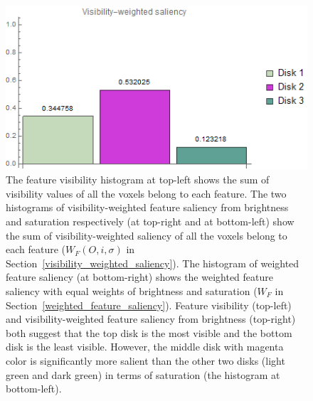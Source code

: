 \begin{figure}
\begin{minipage}{.2\textwidth}
	\end{minipage}~
	\begin{minipage}{.2\textwidth}
		\includegraphics[width=1\linewidth]{images/disk_visibility_saliency_weighted_chart_left.png}
	\end{minipage}
	\caption{The feature visibility \cite{wang_efficient_2011} histogram at top-left shows the sum of visibility values of all the voxels belong to each feature.
		The two histograms of visibility-weighted feature saliency from brightness and saturation respectively (at top-right and at bottom-left) show the sum of visibility-weighted saliency of all the voxels belong to each feature ($ W_{F}(O,i,\sigma) $ in Section~\ref{visibility_weighted_saliency}).
		The histogram of weighted feature saliency (at bottom-right) shows the weighted feature saliency with equal weights of brightness and saturation ($ W_{F} $ in Section~\ref{weighted_feature_saliency}).
		Feature visibility (top-left) and visibility-weighted feature saliency from brightness (top-right) both suggest that the top disk is the most visible and the bottom disk is the least visible.
		However, the middle disk with magenta color is significantly more salient than the other two disks (light green and dark green) in terms of saturation (the histogram at bottom-left).
	}
	\label{fig:disks_saliency_chart_left}
\end{figure}

